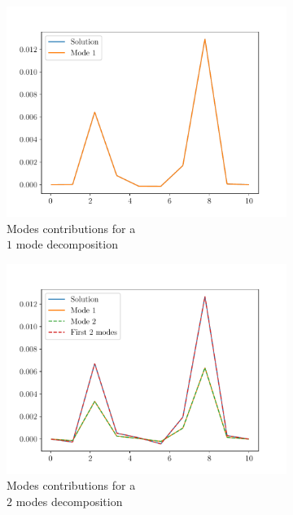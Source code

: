 \begin{figure}
    \begin{subfigure}{0.3\linewidth}
        \centering
        \includegraphics[width=\linewidth]{Figures/Comp_full_fields1.pdf}
        \caption{Modes contributions for a \\$1$ mode decomposition}
    \end{subfigure}
    \begin{subfigure}{0.3\linewidth}
        \centering
        \includegraphics[width=\linewidth]{Figures/Comp_full_fields2.pdf}
        \caption{Modes contributions for a \\$2$ modes decomposition}
    \end{subfigure}
    \begin{subfigure}{0.3\linewidth}

\end{subfigure}
\end{figure}
